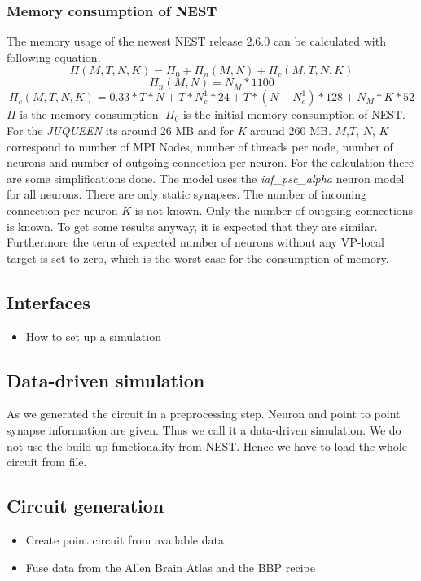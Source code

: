 \documentclass[a4paper]{article}
\begin{document}
\subsubsection{Memory consumption of NEST}
The memory usage of the newest NEST release 2.6.0 can be calculated with following equation. \cite{kunkel2014spiking}
\begin{equation}
  \Pi(M,T,N,K) =  \Pi_0 + \Pi_n(M,N)  + \Pi_c(M,T,N,K)
  \label{eq:NESTmemconsumption}
\end{equation} 
\begin{equation}
  \Pi_n(M,N) = N_M*1100
\end{equation}
\begin{equation}
  \Pi_c(M,T,N,K) = 0.33 * T * N + T * N^1_c * 24 + T*(N-N^1_c)*128 + N_M*K*52
\end{equation}
$\Pi$ is the memory consumption. $\Pi_0$ is the initial memory consumption of NEST.
For the \emph{JUQUEEN} its around 26 MB and for \emph{K} around 260 MB.
$M$,$T$, $N$, $K$ correspond to number of MPI Nodes, number of threads per node, number of neurons and number of outgoing connection per neuron.
For the calculation there are some simplifications done.
The model uses the \emph{iaf\_psc\_alpha} neuron model for all neurons. There are only static synapses.
The number of incoming connection per neuron $K$ is not known. Only the number of outgoing connections is known.
To get some results anyway, it is expected that they are similar.
Furthermore the term of expected number of neurons without any VP-local target is set to zero, which is the worst case for the consumption of memory.

\subsection{Interfaces}
\begin{itemize}
      \item How to set up a simulation
\end{itemize}

\subsection{Data-driven simulation}
As we generated the circuit in a preprocessing step. Neuron and point to point synapse information are given.
Thus we call it a data-driven simulation. We do not use the build-up functionality from NEST.
Hence we have to load the whole circuit from file.

\newpage
\subsection{Circuit generation}
\begin{itemize}
      \item Create point circuit from available data
      \item Fuse data from the Allen Brain Atlas and the BBP recipe
   \end{itemize}
\end{document}
